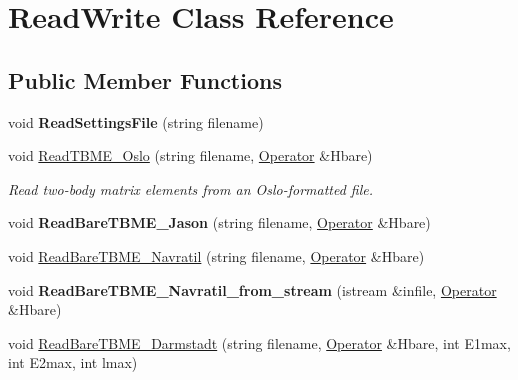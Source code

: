 \hypertarget{classReadWrite}{\section{Read\-Write Class Reference}
\label{classReadWrite}
}
\subsection*{Public Member Functions}
\begin{DoxyCompactItemize}
\item 
\hypertarget{classReadWrite_a7074f8c5e6b1bbeb90a4c534b913ac53}{void {\bfseries Read\-Settings\-File} (string filename)}\label{classReadWrite_a7074f8c5e6b1bbeb90a4c534b913ac53}

\item 
\hypertarget{classReadWrite_aa8d42bb8082881c30331a44f01118381}{void \hyperlink{classReadWrite_aa8d42bb8082881c30331a44f01118381}{Read\-T\-B\-M\-E\-\_\-\-Oslo} (string filename, \hyperlink{classOperator}{Operator} \&Hbare)}\label{classReadWrite_aa8d42bb8082881c30331a44f01118381}

\begin{DoxyCompactList}\small\item\em Read two-\/body matrix elements from an Oslo-\/formatted file. \end{DoxyCompactList}\item 
\hypertarget{classReadWrite_ae5271000cceab5fcebab7e9d2faf9f1f}{void {\bfseries Read\-Bare\-T\-B\-M\-E\-\_\-\-Jason} (string filename, \hyperlink{classOperator}{Operator} \&Hbare)}\label{classReadWrite_ae5271000cceab5fcebab7e9d2faf9f1f}

\item 
void \hyperlink{classReadWrite_ab66f5d7e2e352e973597915c08cad45d}{Read\-Bare\-T\-B\-M\-E\-\_\-\-Navratil} (string filename, \hyperlink{classOperator}{Operator} \&Hbare)
\item 
\hypertarget{classReadWrite_a5945175ede7c2a040f09cfbc799b3066}{void {\bfseries Read\-Bare\-T\-B\-M\-E\-\_\-\-Navratil\-\_\-from\-\_\-stream} (istream \&infile, \hyperlink{classOperator}{Operator} \&Hbare)}\label{classReadWrite_a5945175ede7c2a040f09cfbc799b3066}

\item 
\hypertarget{classReadWrite_a7d1ea6782d893eab0217bb965fba990e}{void \hyperlink{classReadWrite_a7d1ea6782d893eab0217bb965fba990e}{Read\-Bare\-T\-B\-M\-E\-\_\-\-Darmstadt} (string filename, \hyperlink{classOperator}{Operator} \&Hbare, int E1max, int E2max, int lmax)}\label{classReadWrite_a7d1ea6782d893eab0217bb965fba990e}


\end{DoxyCompactItemize}
